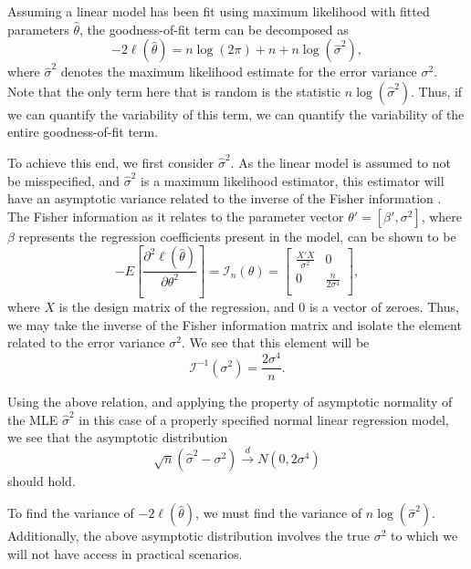 \documentclass[submit]{smj}
\begin{document}
		Assuming a linear model has been fit using maximum likelihood with fitted parameters $\hat{\theta}$, the goodness-of-fit term can be decomposed as
		\begin{equation}
			-2 \ell (\hat{\theta}  ) = n \log(2 \pi) + n + n \log(\hat{\sigma}^2 ) ,
		\end{equation}
		where $\hat{\sigma}^2$ denotes the maximum likelihood estimate for the error variance $\sigma^2$. Note that the only term here that is random is
		the statistic $n \log(\hat{\sigma}^2)$. Thus, if we can quantify the variability of this term, we can quantify the variability of the entire goodness-of-fit
		term.

		To achieve this end, we first consider $\hat{\sigma}^2$. As the linear model is assumed to not be misspecified, and $\hat{\sigma}^2$ is a maximum likelihood
		estimator, this estimator will have an asymptotic variance related to the inverse of the Fisher information \citet{Fisher}. The Fisher information as it relates
		to the parameter vector $\theta' = [\beta', \sigma^2]$, where $\beta$ represents the regression coefficients
		present in the model, can be shown to be
		\begin{equation*}
			- E \left[ \frac{\partial^2 \ell (\hat{\theta}  )}{\partial \theta^2} \right] = \mathcal{I}_{n}(\theta) =
			\begin{bmatrix}
				\frac{X' X}{\sigma^2} & 0 \\
				0 & \frac{n}{2 \sigma^4} \\
			\end{bmatrix}
			,
		\end{equation*}
		where $X$ is the design matrix of the regression, and $0$ is a vector of zeroes. Thus, we may take the inverse of the Fisher information matrix and isolate
		the element related to the error variance $\sigma^2$. We see that this element will be
		\begin{equation*}
			\mathcal{I}^{-1}(\sigma ^2) = \frac{2 \sigma ^4}{n} .
		\end{equation*}
		
		Using the above relation, and applying the property of asymptotic normality of the MLE $\hat{\sigma}^2$ in this case of a properly specified normal linear
		regression model, we see that the asymptotic distribution
		\begin{equation*}
			\sqrt{n} (\hat{\sigma}^2 - \sigma^2) \xrightarrow[]{d} N(0, 2 \sigma ^4 )
		\end{equation*}
		should hold.

		To find the variance of $-2 \ell (\hat{\theta}  )$, we must find the variance of $n \log(\hat{\sigma}^2)$.
		Additionally, the above asymptotic distribution involves the true $\sigma^2$ to which we will not have access in practical scenarios.
\end{document}
